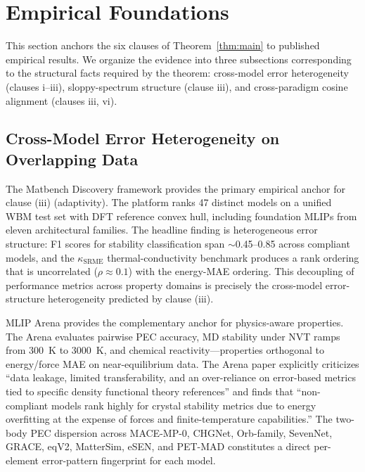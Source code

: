 \section{Empirical Foundations}\label{sec:empirical}

This section anchors the six clauses of Theorem~\ref{thm:main} to published empirical results. We organize the evidence into three subsections corresponding to the structural facts required by the theorem: cross-model error heterogeneity (clauses i--iii), sloppy-spectrum structure (clause iii), and cross-paradigm cosine alignment (clauses iii, vi).

\subsection{Cross-Model Error Heterogeneity on Overlapping Data}\label{sec:heterogeneity}

The Matbench Discovery framework\cite{riebesell2025matbench} provides the primary empirical anchor for clause (iii) (adaptivity). The platform ranks 47 distinct models on a unified WBM test set with DFT reference convex hull, including foundation MLIPs from eleven architectural families. The headline finding is heterogeneous error structure: F1 scores for stability classification span $\sim$0.45--0.85 across compliant models, and the $\kappa_{\text{SRME}}$ thermal-conductivity benchmark\cite{pota2024kappa} produces a rank ordering that is uncorrelated ($\rho \approx 0.1$) with the energy-MAE ordering. This decoupling of performance metrics across property domains is precisely the cross-model error-structure heterogeneity predicted by clause (iii).

MLIP Arena\cite{chiang2025mliparena} provides the complementary anchor for physics-aware properties. The Arena evaluates pairwise PEC accuracy, MD stability under NVT ramps from 300~K to 3000~K, and chemical reactivity---properties orthogonal to energy/force MAE on near-equilibrium data. The Arena paper explicitly criticizes ``data leakage, limited transferability, and an over-reliance on error-based metrics tied to specific density functional theory references'' and finds that ``non-compliant models rank highly for crystal stability metrics due to energy overfitting at the expense of forces and finite-temperature capabilities.'' The two-body PEC dispersion across MACE-MP-0, CHGNet, Orb-family, SevenNet, GRACE, eqV2, MatterSim, eSEN, and PET-MAD constitutes a direct per-element error-pattern fingerprint for each model.

